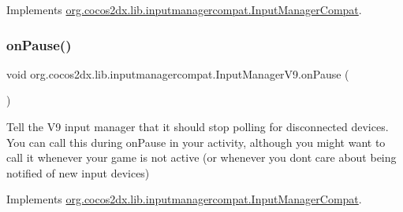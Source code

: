 Implements \hyperlink{interfaceorg_1_1cocos2dx_1_1lib_1_1inputmanagercompat_1_1InputManagerCompat_a813a0308659d716c9503d44ccb48ebb1}{org.\+cocos2dx.\+lib.\+inputmanagercompat.\+Input\+Manager\+Compat}.

\mbox{\label{classorg_1_1cocos2dx_1_1lib_1_1inputmanagercompat_1_1InputManagerV9_ab80665476c8b79b16cbea8b2679effc6}} 
\subsubsection{\texorpdfstring{on\+Pause()}{onPause()}\hspace{0.1cm}{\footnotesize\ttfamily [1/2]}}
{\footnotesize\ttfamily void org.\+cocos2dx.\+lib.\+inputmanagercompat.\+Input\+Manager\+V9.\+on\+Pause (\begin{DoxyParamCaption}{ }\end{DoxyParamCaption})\hspace{0.3cm}{\ttfamily [inline]}}

Tell the V9 input manager that it should stop polling for disconnected devices. You can call this during on\+Pause in your activity, although you might want to call it whenever your game is not active (or whenever you don\textquotesingle{}t care about being notified of new input devices) 

Implements \hyperlink{interfaceorg_1_1cocos2dx_1_1lib_1_1inputmanagercompat_1_1InputManagerCompat_a75e607a2bc756ca935665236f995dd0e}{org.\+cocos2dx.\+lib.\+inputmanagercompat.\+Input\+Manager\+Compat}.

\mbox{\label{classorg_1_1cocos2dx_1_1lib_1_1inputmanagercompat_1_1InputManagerV9_ab80665476c8b79b16cbea8b2679effc6}} 
